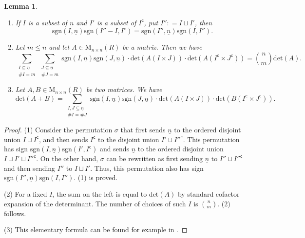 \documentclass[12pt]{amsart}
\newtheorem{lemma}[subsection]{Lemma}
\theoremstyle{definition}
\numberwithin{equation}{subsection}
\def\rmM{\mathrm{M}}
\def\sfc{\mathsf{c}}
\renewcommand{\det}{\mathrm{det}}
\newcommand{\sgn}{\mathrm{sgn}}
\begin{document}
\begin{lemma}
\label{L:cofactor expansion formula}
\begin{enumerate}
\item If $I$ is a subset of $\underline n$ and $I'$ is a subset of $I^\sfc$, put $I'': = I \sqcup I'$, then
$$
\sgn(I, \underline n) \sgn (I''- I, I^\sfc) = \sgn(I'', \underline n) \sgn(I, I'').
$$
\item Let $m  \leq n$ and let $A \in \rmM_{n \times n}(R)$ be a matrix. Then we have
$$
\sum_{\substack{I \subseteq \underline n\\ \#I = m}} \sum_{\substack{J \subseteq \underline n\\ \#J = m}}\sgn(I, \underline n) \sgn(J, \underline n)\cdot  \det (A(I \times J))\cdot \det(A(I^\sfc\times  J^\sfc)) = \binom nm \det(A).
$$
\item Let $A, B \in \rmM_{n\times n}(R)$ be two matrices. We have
$$
\det(A+B) = \sum_{\substack{I, J \subseteq \underline n\\ \#I = \# J}} \sgn (I, \underline n) \sgn (J, \underline n) \cdot \det ( A(I \times J)) \cdot \det ( B(I^\sfc \times J^\sfc)).
$$
\end{enumerate}
\end{lemma}
\begin{proof}
(1) Consider the permutation $\sigma$ that first sends $\underline n$ to the ordered disjoint union $I\sqcup I^\sfc$, and then sends $I^\sfc$ to the disjoint union $ I'\sqcup I''^\sfc$. This permutation has sign $\sgn(I, \underline n)\sgn(I', I^\sfc)$ and sends $\underline n$ to the ordered disjoint union $I\sqcup I'\sqcup I''^\sfc$. On the other hand, $\sigma$ can be rewritten as first sending $\underline n$ to $I''\sqcup I''^\sfc$ and then sending $I''$ to $I\sqcup I'$. Thus, this permutation also has sign $\sgn(I'',\underline n)\sgn(I,I'')$. (1) is proved.

(2) For a fixed $I$, the sum on the left is equal to $\det(A)$ by standard cofactor expansion of the determinant. The number of choices of such $I$ is $\binom nm$. (2) follows.

(3) This elementary formula can be found for example in \cite[Equation (1)]{marcus}.
\end{proof}
\end{document}
